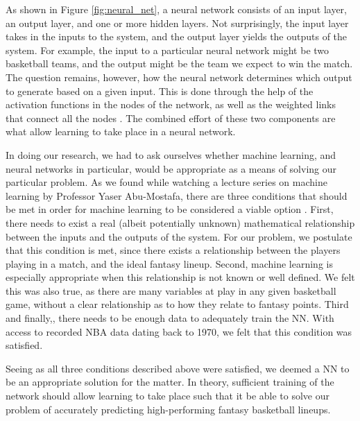 As shown in Figure \ref{fig:neural_net}, a neural network consists of an input layer, an output layer, and one or more hidden layers. Not surprisingly, the input layer takes in the inputs to the system, and the output layer yields the outputs of the system. For example, the input to a particular neural network might be two basketball teams, and the output might be the team we expect to win the match. The question remains, however, how the neural network determines which output to generate based on a given input. This is done through the help of the activation functions in the nodes of the network, as well as the weighted links that connect all the nodes \cite{neural_net_fundies}. The combined effort of these two components are what allow learning to take place in a neural network.

In doing our research, we had to ask ourselves whether machine learning, and neural networks in particular, would be appropriate as a means of solving our particular problem. As we found while watching a lecture series on machine learning by Professor Yaser Abu-Mostafa, there are three conditions that should be met in order for machine learning to be considered a viable option \cite{caltech}. First, there needs to exist a real  (albeit potentially unknown) mathematical relationship between the inputs and the outputs of the system. For our problem, we postulate that this condition is met, since there exists a relationship between the players playing in a match, and the ideal fantasy lineup. Second, machine learning is especially appropriate when this relationship is not known or well defined. We felt this was also true, as there are many variables at play in any given basketball game, without a clear relationship as to how they relate to fantasy points. Third and finally,, there needs to be enough data to adequately train the NN. With access to recorded NBA data dating back to 1970, we felt that this condition was satisfied. 

Seeing as all three conditions described above were satisfied, we deemed a NN to be an appropriate solution for the matter. In theory, sufficient training of the network should allow learning to take place such that it be able to solve our problem of accurately predicting high-performing fantasy basketball lineups.
